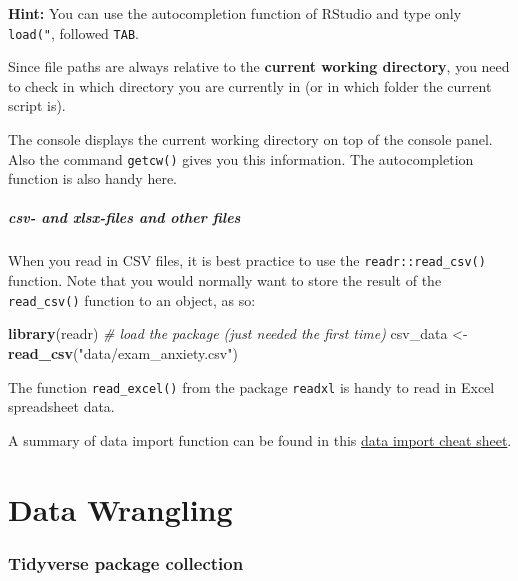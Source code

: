 \documentclass[
]{scrartcl}
\makeatletter
\newenvironment{Shaded}{\begin{snugshade}}{\end{snugshade}}
\newcommand{\CommentTok}[1]{\textcolor[rgb]{0.56,0.35,0.01}{\textit{#1}}}
\newcommand{\KeywordTok}[1]{\textcolor[rgb]{0.13,0.29,0.53}{\textbf{#1}}}
\newcommand{\NormalTok}[1]{#1}
\newcommand{\StringTok}[1]{\textcolor[rgb]{0.31,0.60,0.02}{#1}}
\newenvironment{kframe}{%
\medskip{}
\setlength{\fboxsep}{.8em}
 \def\at@end@of@kframe{}%
 \ifinner\ifhmode%
  \def\at@end@of@kframe{\end{minipage}}%
  \begin{minipage}{\columnwidth}%
 \fi\fi%
 \def\FrameCommand##1{\hskip\@totalleftmargin \hskip-\fboxsep
 \colorbox{shadecolor}{##1}\hskip-\fboxsep
     \hskip-\linewidth \hskip-\@totalleftmargin \hskip\columnwidth}%
 \MakeFramed {\advance\hsize-\width
   \@totalleftmargin\z@ \linewidth\hsize
   \@setminipage}}%
 {\par\unskip\endMakeFramed%
 \at@end@of@kframe}
\newenvironment{rmdblock}[1]
  {
  \begin{itemize}
  \renewcommand{\labelitemi}{
    \raisebox{-.7\height}[0pt][0pt]{
      {\setkeys{Gin}{width=3em,keepaspectratio}\texttt{[image: images/\#1]}}
    }
  }
  \setlength{\fboxsep}{1em}
  \begin{kframe}
  \item
  }
  {
  \end{kframe}
  \end{itemize}
  }
\newenvironment{important}
    {\begin{rmdblock}{hint}}
    {\end{rmdblock}}
\makeatother
\begin{document}
\textbf{Hint:} You can use the autocompletion function of RStudio and type only \texttt{load("}, followed \texttt{TAB}.

\begin{important}
Since file paths are always relative to the \textbf{current working
directory}, you need to check in which directory you are currently in
(or in which folder the current script is).

The console displays the current working directory on top of the console
panel. Also the command \texttt{getcw()} gives you this information. The
autocompletion function is also handy here.
\end{important}

\hypertarget{csv--and-xlsx-files-and-other-files}{%
\subsubsection*{csv- and xlsx-files and other files}\label{csv--and-xlsx-files-and-other-files}}

When you read in CSV files, it is best practice to use the \texttt{readr::read\_csv()} function. Note that you would normally want to store the result of the \texttt{read\_csv()} function to an object, as so:

\begin{Shaded}
\begin{Highlighting}[]
\KeywordTok{library}\NormalTok{(readr) }\CommentTok{\# load the package (just needed the first time)}
\NormalTok{csv\_data \textless{}{-}}\StringTok{ }\KeywordTok{read\_csv}\NormalTok{(}\StringTok{"data/exam\_anxiety.csv"}\NormalTok{)}
\end{Highlighting}
\end{Shaded}

The function \texttt{read\_excel()} from the package \texttt{readxl} is handy to read in Excel spreadsheet data.

A summary of data import function can be found in this \protect\hyperlink{cheatsheets}{data import cheat sheet}.

\newpage

\hypertarget{part-data-wrangling}{%
\part{Data Wrangling}\label{part-data-wrangling}}

\hypertarget{tidyverse-package-collection}{%
\section{Tidyverse package collection}\label{tidyverse-package-collection}}
\end{document}
